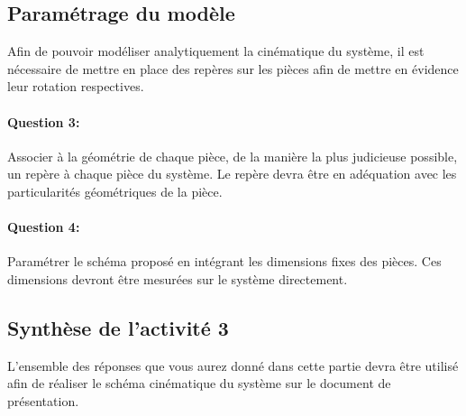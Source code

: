\subsection{Paramétrage du modèle}

Afin de pouvoir modéliser analytiquement la cinématique du système, il est nécessaire de mettre en place des repères sur les pièces afin de mettre en évidence leur rotation respectives.

\paragraph{Question 3:} Associer à la géométrie de chaque pièce, de la manière la plus judicieuse possible, un repère à chaque pièce du système. Le repère devra être en adéquation avec les particularités géométriques de la pièce.

\paragraph{Question 4:} Paramétrer le schéma proposé en intégrant les dimensions fixes des pièces. Ces dimensions devront être mesurées sur le système directement.

\subsection{Synthèse de l'activité 3}

L'ensemble des réponses que vous aurez donné dans cette partie devra être utilisé afin de réaliser le schéma cinématique du système sur le document de présentation.


